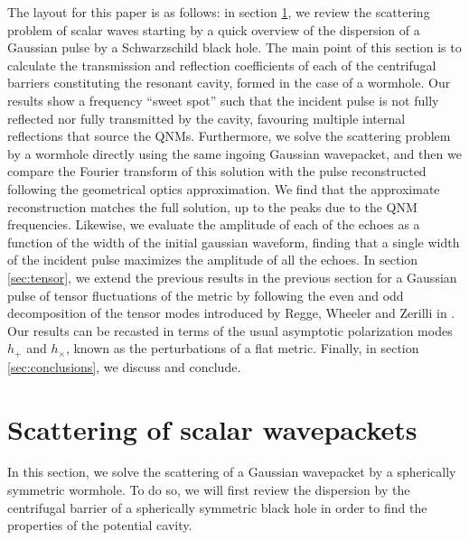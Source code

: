 \documentclass[article,aps,nofootinbib,twocolumn,superscriptaddress]{revtex4-1}
\begin{document}
The layout for this paper is as follows: in section \ref{sec:scalar}, we review the scattering problem of scalar waves starting by a quick overview of the dispersion of a Gaussian pulse by a Schwarzschild black hole. The main point of this section is to calculate the transmission and reflection coefficients of each of the centrifugal barriers constituting the resonant cavity, formed in the case of a wormhole. Our results show a frequency ``sweet spot'' such that the incident pulse is not fully reflected nor fully transmitted by the cavity, favouring multiple internal reflections that source the QNMs.  Furthermore, we solve the scattering problem by a wormhole directly using the same ingoing Gaussian wavepacket, and then we compare the Fourier transform of this solution with the pulse reconstructed following the geometrical optics approximation. We find that the approximate reconstruction matches the full solution, up to the peaks due to the QNM frequencies. Likewise, we evaluate the amplitude of each of the echoes as a function of the width of the initial gaussian waveform, finding that a single width of the incident pulse maximizes the amplitude of all the echoes. In section \ref{sec:tensor}, we extend the previous results in the previous section for a Gaussian pulse of tensor fluctuations of the metric by following the even and odd decomposition of the tensor modes introduced by Regge, Wheeler and Zerilli in \citep{Regge:1957td, PhysRevD.2.2141, PhysRevD.5.2419, PhysRevD.5.2439}. Our results can be recasted in terms of the usual asymptotic polarization modes $h_+$ and $h_{\times}$, known as the perturbations of a flat metric. Finally, in section \ref{sec:conclusions}, we discuss and conclude.

\section{Scattering of scalar wavepackets}\label{sec:scalar}
In this section, we solve the scattering of a Gaussian wavepacket by a spherically symmetric wormhole. To do so, we will first review the dispersion by the centrifugal barrier of a spherically symmetric black hole in order to find the properties of the potential cavity.
\end{document}
